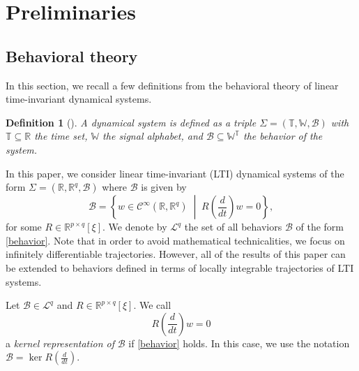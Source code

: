 \documentclass[letterpaper, 10 pt, conference]{ieeeconf}
\theoremstyle{ieeeconf}
\newtheorem{definition}{Definition}
\newcommand{\R}{\mathbb{R}}
\newcommand{\B}{\mathcal{B}}
\newcommand{\set}[2]{\left\{ #1 \;\middle| \; #2 \right\}}
\begin{document}
\section{Preliminaries}
\label{sec:Preliminaries}
\subsection{Behavioral theory}
In this section, we recall a few definitions from the behavioral theory of linear time-invariant dynamical systems. 

\begin{definition}[]
A \emph{dynamical system} is defined as a triple $\Sigma=(\mathbb{T}, \mathbb{W},\B)$ with $\mathbb{T} \subseteq \R$ the \emph{time set}, $\mathbb{W}$ the \emph{signal alphabet}, and $\B \subseteq \mathbb{W}^{\mathbb{T}}$ the \emph{behavior} of the system. 
\end{definition}

In this paper, we consider linear time-invariant (LTI) dynamical systems of the form $\Sigma=(\R,\R^q,\B)$ where $\B$ is given by 
\vspace{-1.5ex}
\begin{equation}
\B = \set{w\in \mathcal{C}^\infty(\R,\R^q)}{R\left(\frac{d}{dt}\right)w=0},
\label{behavior}
\end{equation} 
for some $R \in \R^{p \times q}[\xi]$. 
We denote by $\mathcal{L}^q$ the set of all behaviors $\B$ of the form \eqref{behavior}. Note that in order to avoid mathematical technicalities, we focus on infinitely differentiable trajectories. However, all of the results of this paper can be extended to behaviors defined in terms of locally integrable trajectories of LTI systems.

Let $\B \in \mathcal{L}^q$
and  $R \in \R^{p \times q}[\xi]$. We call \vspace{-0.5ex}
\begin{equation}
R\left(\frac{d}{dt}\right)w=0
\label{ker rep}
\end{equation} a \emph{kernel representation of} $\B$ if \eqref{behavior} holds. In this case, we use the notation $\B =\ker R\left(\frac{d}{dt}\right)$. 
\end{document}

